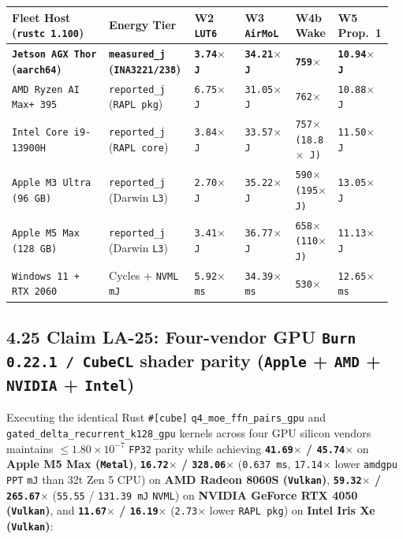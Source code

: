 \documentclass[10pt]{article}
\begin{document}
{\footnotesize\setlength{\tabcolsep}{2.2pt}
\begin{longtable}{@{}L{0.25\linewidth}L{0.22\linewidth}C{0.13\linewidth}C{0.13\linewidth}C{0.11\linewidth}C{0.12\linewidth}@{}}
\toprule
\textbf{Fleet Host (\texttt{rustc 1.100})} & \textbf{Energy Tier} & \textbf{W2 \texttt{LUT6}} & \textbf{W3 \texttt{AirMoL}} & \textbf{W4b Wake} & \textbf{W5 Prop.\ 1} \\
\midrule
\endhead
\textbf{\texttt{Jetson AGX Thor} (\texttt{aarch64})} & \textbf{\texttt{measured\_j} (\texttt{INA3221/238})} & \textbf{\texttt{3.74$\times$ J}} & \textbf{\texttt{34.21$\times$ J}} & \textbf{\texttt{759$\times$}} & \textbf{\texttt{10.94$\times$ J}} \\
\texttt{AMD Ryzen AI Max+ 395} & \texttt{reported\_j} (\texttt{RAPL pkg}) & \texttt{6.75$\times$ J} & \texttt{31.05$\times$ J} & \texttt{762$\times$} & \texttt{10.88$\times$ J} \\
\texttt{Intel Core i9-13900H} & \texttt{reported\_j} (\texttt{RAPL core}) & \texttt{3.84$\times$ J} & \texttt{33.57$\times$ J} & \texttt{757$\times$ (18.8$\times$ J)} & \texttt{11.50$\times$ J} \\
\texttt{Apple M3 Ultra (96 GB)} & \texttt{reported\_j} (Darwin \texttt{L3}) & \texttt{2.70$\times$ J} & \texttt{35.22$\times$ J} & \texttt{590$\times$ (195$\times$ J)} & \texttt{13.05$\times$ J} \\
\texttt{Apple M5 Max (128 GB)} & \texttt{reported\_j} (Darwin \texttt{L3}) & \texttt{3.41$\times$ J} & \texttt{36.77$\times$ J} & \texttt{658$\times$ (110$\times$ J)} & \texttt{11.13$\times$ J} \\
\texttt{Windows 11 + RTX 2060} & Cycles + \texttt{NVML} \texttt{mJ} & \texttt{5.92$\times$ ms} & \texttt{34.39$\times$ ms} & \texttt{530$\times$} & \texttt{12.65$\times$ ms} \\
\bottomrule
\end{longtable}
}

\subsection{4.25 Claim LA-25: Four-vendor GPU \texttt{Burn 0.22.1 / CubeCL} shader parity (\texttt{Apple} + \texttt{AMD} + \texttt{NVIDIA} + \texttt{Intel})}\label{claim-la25}

Executing the identical Rust \texttt{\#[cube]} \texttt{q4\_moe\_ffn\_pairs\_gpu} and \texttt{gated\_delta\_recurrent\_k128\_gpu} kernels across four GPU silicon vendors maintains $\le 1.80 \times 10^{-7}$ \texttt{FP32} parity while achieving \textbf{\texttt{41.69$\times$} / \texttt{45.74$\times$}} on \textbf{Apple M5 Max (\texttt{Metal})}, \textbf{\texttt{16.72$\times$} / \texttt{328.06$\times$}} (\texttt{0.637 ms}, \texttt{17.14$\times$} lower \texttt{amdgpu PPT} \texttt{mJ} than 32t Zen 5 CPU) on \textbf{AMD Radeon 8060S (\texttt{Vulkan})}, \textbf{\texttt{59.32$\times$} / \texttt{265.67$\times$}} (\texttt{55.55} / \texttt{131.39 mJ} \texttt{NVML}) on \textbf{NVIDIA GeForce RTX 4050 (\texttt{Vulkan})}, and \textbf{\texttt{11.67$\times$} / \texttt{16.19$\times$}} (\texttt{2.73$\times$} lower \texttt{RAPL pkg}) on \textbf{Intel Iris Xe (\texttt{Vulkan})}:
\end{document}
